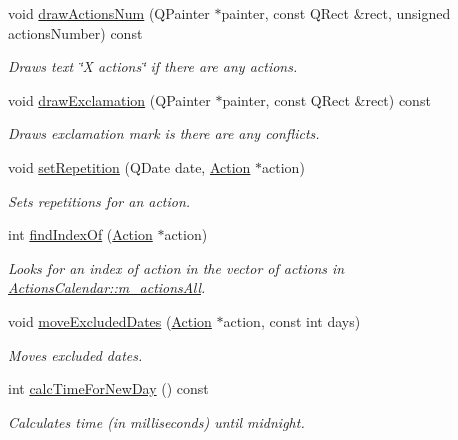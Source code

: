 \begin{DoxyCompactItemize}
\item 
void \hyperlink{class_actions_calendar_aa795d75595b42669e4367f5a7df5cb5c}{draw\-Actions\-Num} (Q\-Painter $\ast$painter, const Q\-Rect \&rect, unsigned actions\-Number) const 
\begin{DoxyCompactList}\small\item\em Draws text \char`\"{}\-X actions\char`\"{} if there are any actions. \end{DoxyCompactList}\item 
void \hyperlink{class_actions_calendar_a1303b962c0dd55284ed5d67d9ebcedcf}{draw\-Exclamation} (Q\-Painter $\ast$painter, const Q\-Rect \&rect) const 
\begin{DoxyCompactList}\small\item\em Draws exclamation mark is there are any conflicts. \end{DoxyCompactList}\item 
void \hyperlink{class_actions_calendar_a9cbce63eaf560e98255c98b7af1f6bce}{set\-Repetition} (Q\-Date date, \hyperlink{class_action}{Action} $\ast$action)
\begin{DoxyCompactList}\small\item\em Sets repetitions for an action. \end{DoxyCompactList}\item 
int \hyperlink{class_actions_calendar_a942fcf56d359d6cb4907bca6eef0ffa4}{find\-Index\-Of} (\hyperlink{class_action}{Action} $\ast$action)
\begin{DoxyCompactList}\small\item\em Looks for an index of action in the vector of actions in \hyperlink{class_actions_calendar_af0f496503f8aff7dc3edbb0fdf3310b4}{Actions\-Calendar\-::m\-\_\-actions\-All}. \end{DoxyCompactList}\item 
void \hyperlink{class_actions_calendar_a87c934ef81eef5e2c3ee73d0c0d95387}{move\-Excluded\-Dates} (\hyperlink{class_action}{Action} $\ast$action, const int days)
\begin{DoxyCompactList}\small\item\em Moves excluded dates. \end{DoxyCompactList}\item 
int \hyperlink{class_actions_calendar_a54994066a3ea4c7f56cff15bae20a510}{calc\-Time\-For\-New\-Day} () const 
\begin{DoxyCompactList}\small\item\em Calculates time (in milliseconds) until midnight. \end{DoxyCompactList}\end{DoxyCompactItemize}
